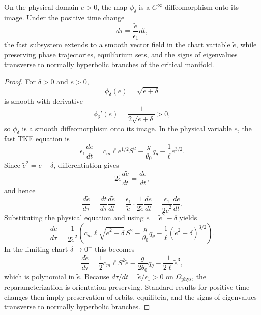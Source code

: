 \begin{proposition}
On the physical domain $e > 0$, the map $\phi_\delta$ is a $C^\infty$ diffeomorphism onto its image. Under the positive time change
\begin{equation}
d\tau = \frac{\tilde e}{\epsilon_1} dt,
\end{equation}
the fast subsystem extends to a smooth vector field in the chart variable $\tilde e$, while preserving phase trajectories, equilibrium sets, and the signs of eigenvalues transverse to normally hyperbolic branches of the critical manifold.
\end{proposition}

\begin{proof}
For $\delta > 0$ and $e > 0$,
\begin{equation}
\phi_\delta(e) = \sqrt{e+\delta}
\end{equation}
is smooth with derivative
\begin{equation}
\phi_\delta'(e) = \frac{1}{2\sqrt{e+\delta}} > 0,
\end{equation}
so $\phi_\delta$ is a smooth diffeomorphism onto its image. In the physical variable $e$, the fast TKE equation is
\begin{equation}
\epsilon_1 \frac{de}{dt}
= c_m \ell e^{1/2} S^2
- \frac{g}{\theta_0} q_\theta
- \frac{1}{\ell} e^{3/2}.
\end{equation}
Since $\tilde e^2 = e + \delta$, differentiation gives
\begin{equation}
2\tilde e \frac{d\tilde e}{dt} = \frac{de}{dt},
\end{equation}
and hence
\begin{equation}
\frac{d\tilde e}{d\tau}
= \frac{dt}{d\tau}\frac{d\tilde e}{dt}
= \frac{\epsilon_1}{\tilde e}\cdot \frac{1}{2\tilde e}\frac{de}{dt}
= \frac{\epsilon_1}{2\tilde e^2}\frac{de}{dt}.
\end{equation}
Substituting the physical equation and using $e = \tilde e^2 - \delta$ yields
\begin{equation}
\frac{d\tilde e}{d\tau}
= \frac{1}{2\tilde e^2}
\left(
c_m \ell \sqrt{\tilde e^2 - \delta}\,S^2
- \frac{g}{\theta_0} q_\theta
- \frac{1}{\ell}(\tilde e^2 - \delta)^{3/2}
\right).
\end{equation}
In the limiting chart $\delta \to 0^+$ this becomes
\begin{equation}
\frac{d\tilde e}{d\tau}
= \frac{1}{2} c_m \ell S^2 \tilde e
- \frac{g}{2\theta_0} q_\theta
- \frac{1}{2\ell} \tilde e^3,
\end{equation}
which is polynomial in $\tilde e$. Because $d\tau/dt = \tilde e/\epsilon_1 > 0$ on $\Omega_{\mathrm{phys}}$, the reparameterization is orientation preserving. Standard results for positive time changes then imply preservation of orbits, equilibria, and the signs of eigenvalues transverse to normally hyperbolic branches.
\end{proof}


